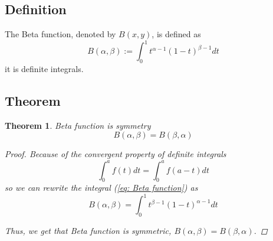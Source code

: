 \documentclass[a4paper]{article}
\newtheorem{theorem}{Theorem}[section]
\begin{document}
\subsection{Definition}
The Beta function, denoted by \(B(x, y)\), is defined as
\begin{equation}
    B(\alpha, \beta) := \int_{0}^{1} t^{\alpha-1} (1-t)^{\beta-1} dt
    \label{eq: Beta function}
\end{equation}
it is definite integrals.

\subsection{Theorem}

\begin{theorem}
    Beta function is symmetry
    \begin{equation}
        B(\alpha, \beta) = B(\beta, \alpha)
    \end{equation}

    \begin{proof}
        Because of the convergent property of definite integrals
        \begin{equation*}
            \int_{0}^{a} f(t) dt = \int_{0}^{a} f(a-t) dt
        \end{equation*}
        so we can rewrite the integral (\ref{eq: Beta function}) as
        \begin{equation*}
            B(\alpha, \beta) = \int_{0}^{1} t^{\beta-1} (1-t)^{\alpha-1} dt
        \end{equation*}

        Thus, we get that Beta function is symmetric, $B(\alpha, \beta) = B(\beta, \alpha)$.
    \end{proof}

\end{theorem}
\end{document}
